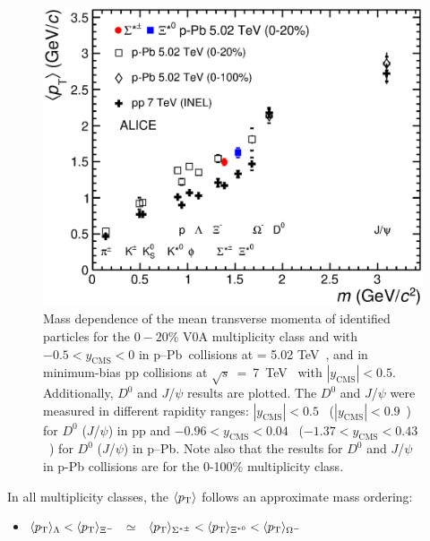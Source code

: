 \begin{figure}[htbp]
\begin{center}
\includegraphics[width=10.cm]{./Version1/FigChapter6/mpt/mpt_mass.eps}
\caption{Mass dependence of the mean transverse momenta of identified particles for the $0-20$\% V0A multiplicity class and with $-0.5<y_{\mathrm{CMS}}<0$ in p--Pb~collisions at \snn = 5.02 TeV~\cite{cite:lambda_pPb, cite:Xi_pPb}, and 
  in minimum-bias pp collisions at $\sqrt{s}$~=~7~TeV~\cite{cite:Xi_pp} with $|y_{\mathrm{CMS}}|<0.5$. Additionally, $D^0$ and $J$/$\psi$ results are plotted. The $D^0$ and $J$/$\psi$ were measured in different rapidity ranges: $|y_{\mathrm{CMS}}|<0.5$~\cite{cite:D0} 
  ($|y_{\mathrm{CMS}}|<0.9$~\cite{cite:Jpsi_pp}) for $D^0$ ($J$/$\psi$) in pp and $-0.96 < y_{\mathrm{CMS}}< 0.04$~\cite{cite:D0} ($-1.37<y_{\mathrm{CMS}}<0.43$~\cite{cite:Jpsi_pPb}) 
  for $D^0$ ($J$/$\psi$) in p--Pb. Note also that the results for $D^0$ and $J$/$\psi$ in p-Pb collisions are for the 0-100\% multiplicity class.}
  \label{fig:mean_pt_vs_mass}
 \end{center}
\end{figure}

In all multiplicity classes, the $\langle p_{\mathrm{T}}\rangle$ follows an approximate mass ordering:  
\begin{itemize}
\item $\langle p_{\mathrm{T}}\rangle_{\Lambda}<\langle p_{\mathrm{T}}\rangle_{\Xi^-}$~$\simeq$~$\langle p_{\mathrm{T}}\rangle_{\Sigma^{*\pm}}<\langle p_{\mathrm{T}}\rangle_{\Xi^{*0}}<\langle p_{\mathrm{T}}\rangle_{\Omega^{-}}$ 
\end{itemize}

